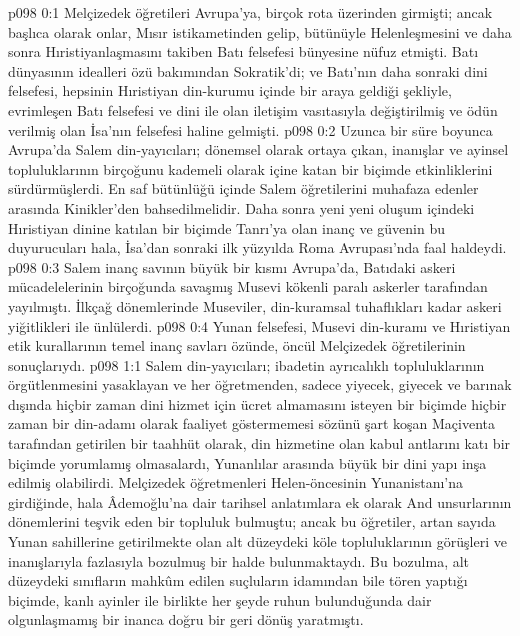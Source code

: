 \vs p098 0:1 Melçizedek öğretileri Avrupa’ya, birçok rota üzerinden girmişti; ancak başlıca olarak onlar, Mısır istikametinden gelip, bütünüyle Helenleşmesini ve daha sonra Hıristiyanlaşmasını takiben Batı felsefesi bünyesine nüfuz etmişti. Batı dünyasının idealleri özü bakımından Sokratik’di; ve Batı’nın daha sonraki dini felsefesi, hepsinin Hıristiyan din\hyp{}kurumu içinde bir araya geldiği şekliyle, evrimleşen Batı felsefesi ve dini ile olan iletişim vasıtasıyla değiştirilmiş ve ödün verilmiş olan İsa’nın felsefesi haline gelmişti.
\vs p098 0:2 Uzunca bir süre boyunca Avrupa’da Salem din\hyp{}yayıcıları; dönemsel olarak ortaya çıkan, inanışlar ve ayinsel topluluklarının birçoğunu kademeli olarak içine katan bir biçimde etkinliklerini sürdürmüşlerdi. En saf bütünlüğü içinde Salem öğretilerini muhafaza edenler arasında Kinikler’den bahsedilmelidir. Daha sonra yeni yeni oluşum içindeki Hıristiyan dinine katılan bir biçimde Tanrı’ya olan inanç ve güvenin bu duyurucuları hala, İsa’dan sonraki ilk yüzyılda Roma Avrupası’nda faal haldeydi.
\vs p098 0:3 Salem inanç savının büyük bir kısmı Avrupa’da, Batıdaki askeri mücadelelerinin birçoğunda savaşmış Musevi kökenli paralı askerler tarafından yayılmıştı. İlkçağ dönemlerinde Museviler, din\hyp{}kuramsal tuhaflıkları kadar askeri yiğitlikleri ile ünlülerdi.
\vs p098 0:4 Yunan felsefesi, Musevi din\hyp{}kuramı ve Hıristiyan etik kurallarının temel inanç savları özünde, öncül Melçizedek öğretilerinin sonuçlarıydı.
\vs p098 1:1 Salem din\hyp{}yayıcıları; ibadetin ayrıcalıklı topluluklarının örgütlenmesini yasaklayan ve her öğretmenden, sadece yiyecek, giyecek ve barınak dışında hiçbir zaman dini hizmet için ücret almamasını isteyen bir biçimde hiçbir zaman bir din\hyp{}adamı olarak faaliyet göstermemesi sözünü şart koşan Maçiventa tarafından getirilen bir taahhüt olarak, din hizmetine olan kabul antlarını katı bir biçimde yorumlamış olmasalardı, Yunanlılar arasında büyük bir dini yapı inşa edilmiş olabilirdi. Melçizedek öğretmenleri Helen\hyp{}öncesinin Yunanistanı’na girdiğinde, hala Âdemoğlu’na dair tarihsel anlatımlara ek olarak And unsurlarının dönemlerini teşvik eden bir topluluk bulmuştu; ancak bu öğretiler, artan sayıda Yunan sahillerine getirilmekte olan alt düzeydeki köle topluluklarının görüşleri ve inanışlarıyla fazlasıyla bozulmuş bir halde bulunmaktaydı. Bu bozulma, alt düzeydeki sınıfların mahkûm edilen suçluların idamından bile tören yaptığı biçimde, kanlı ayinler ile birlikte her şeyde ruhun bulunduğunda dair olgunlaşmamış bir inanca doğru bir geri dönüş yaratmıştı.
